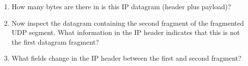 \begin{enumerate}[label=\bfseries Problem \arabic*:,leftmargin=*,labelindent=1em]
        \item How many bytes are there in is this IP datagram (header plus payload)?\\[0.2mm]
        \soln
        \item Now inspect the datagram containing the second fragment of the fragmented UDP segment. What information in the IP header indicates that this is not the first datagram fragment?\\[0.2mm]
        \soln
        \item What fields change in the IP header between the first and second fragment?\\[0.2mm]
        \soln
    \end{enumerate}
\newpage